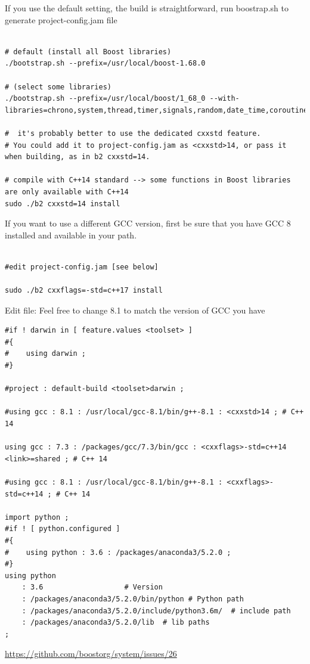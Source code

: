 If you use the default setting, the build is straightforward, run boostrap.sh to generate 
project-config.jam file 
\begin{verbatim}

# default (install all Boost libraries)
./bootstrap.sh --prefix=/usr/local/boost-1.68.0

# (select some libraries)
./bootstrap.sh --prefix=/usr/local/boost/1_68_0 --with-libraries=chrono,system,thread,timer,signals,random,date_time,coroutine

#  it's probably better to use the dedicated cxxstd feature. 
# You could add it to project-config.jam as <cxxstd>14, or pass it when building, as in b2 cxxstd=14.

# compile with C++14 standard --> some functions in Boost libraries are only available with C++14
sudo ./b2 cxxstd=14 install

\end{verbatim}

If you want to use a different GCC version, first be sure that you have GCC 8
installed and available in your path.

\begin{verbatim}

#edit project-config.jam [see below]

sudo ./b2 cxxflags=-std=c++17 install
\end{verbatim}

Edit file: Feel free to change 8.1 to match the version of GCC you have 

\begin{verbatim}
#if ! darwin in [ feature.values <toolset> ]
#{
#    using darwin ;
#}

#project : default-build <toolset>darwin ;
 
#using gcc : 8.1 : /usr/local/gcc-8.1/bin/g++-8.1 : <cxxstd>14 ; # C++ 14

using gcc : 7.3 : /packages/gcc/7.3/bin/gcc : <cxxflags>-std=c++14 <link>=shared ; # C++ 14

#using gcc : 8.1 : /usr/local/gcc-8.1/bin/g++-8.1 : <cxxflags>-std=c++14 ; # C++ 14

import python ;
#if ! [ python.configured ]
#{
#    using python : 3.6 : /packages/anaconda3/5.2.0 ;
#}
using python
    : 3.6                   # Version
    : /packages/anaconda3/5.2.0/bin/python # Python path
    : /packages/anaconda3/5.2.0/include/python3.6m/  # include path
    : /packages/anaconda3/5.2.0/lib  # lib paths
;

\end{verbatim}
\url{https://github.com/boostorg/system/issues/26}


